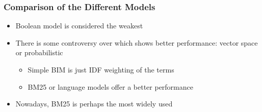 \documentclass[svgnames]{beamer}
\begin{document}
\begin{frame}   \frametitle{Comparison of the Different Models}

  \begin{block}{}
    \begin{itemize}
    \item Boolean model is considered the weakest
    \item There is some controversy over which shows better performance: vector space or probabilistic
     \begin{itemize}
     \item Simple BIM is just IDF weighting of the terms
     \item BM25 or language models offer a better performance
     \end{itemize}
    \item Nowadays, BM25 is perhaps the most widely used
    \end{itemize}
  \end{block}
\end{frame}


\end{document}

